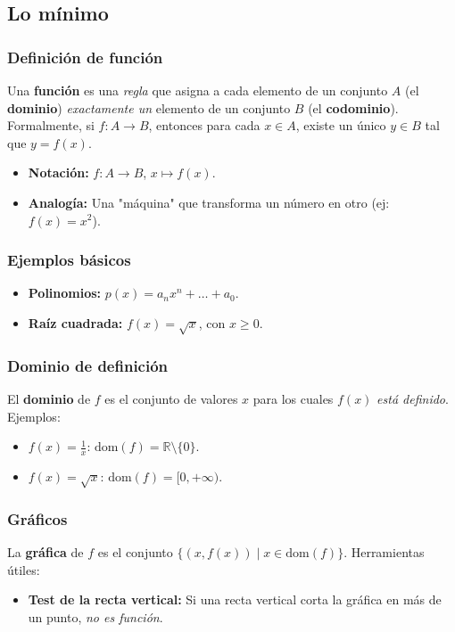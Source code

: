 \documentclass[12pt, a4paper]{article}
\theoremstyle{rioplatense}
\newcommand{\R}{\mathbb{R}}
\newcommand{\dom}{\text{dom}}
\begin{document}
\subsection{Lo mínimo}

\subsubsection{Definición de función}
Una \textbf{función} es una \textit{regla} que asigna a cada elemento de un conjunto \( A \) (el \textbf{dominio}) \textit{exactamente un} elemento de un conjunto \( B \) (el \textbf{codominio}). Formalmente, si \( f: A \to B \), entonces para cada \( x \in A \), existe un único \( y \in B \) tal que \( y = f(x) \).

\begin{itemize}
    \item \textbf{Notación:} \( f: A \to B \), \( x \mapsto f(x) \).
    \item \textbf{Analogía:} Una "máquina" que transforma un número en otro (ej: \( f(x) = x^2 \)).
\end{itemize}

\subsubsection{Ejemplos básicos}
\begin{itemize}
    \item \textbf{Polinomios:} \( p(x) = a_nx^n + \dots + a_0 \).
    \item \textbf{Raíz cuadrada:} \( f(x) = \sqrt{x} \), con \( x\geq 0 %
    \).
\end{itemize}

\subsubsection{Dominio de definición}
El \textbf{dominio} de \( f \) es el conjunto de valores \( x \) para los cuales \( f(x) \) \textit{está definido}. Ejemplos:
\begin{itemize}
    \item \( \displaystyle f(x) = \frac{1}{x} \): \( \dom(f) = \R \setminus \{0\} \).
    \item \( f(x) = \sqrt{x} \): \( \dom(f) = [0, +\infty) \).
\end{itemize}

\subsubsection{Gráficos}
La \textbf{gráfica} de \( f \) es el conjunto \( \{(x, f(x)) \mid x \in \dom(f)\} \). Herramientas útiles:
\begin{itemize}
    \item \textbf{Test de la recta vertical:} Si una recta vertical corta la gráfica en más de un punto, \textit{no es función}.
\end{itemize}
\end{document}
